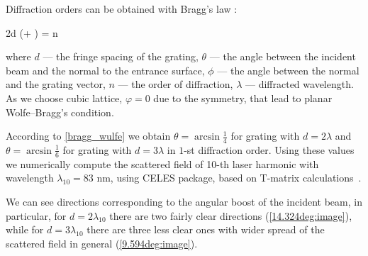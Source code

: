 \documentclass[conference]{IEEEtran}
\begin{document}
Diffraction orders can be obtained with Bragg's law \cite{kress_bernard}:

	\eq
		2d \sin(\theta + \varphi) = n\lambda
		\label{bragg_wulfe}
	\qe

\noindent where $d$ --- the fringe spacing of the grating, $\theta$ --- the angle between the incident beam and the normal to the entrance surface, $\phi$ --- the angle between the normal and the grating vector, $n$ --- the order of diffraction, $\lambda$ --- diffracted wavelength. As we choose cubic lattice, $\varphi = 0$ due to the symmetry, that lead to planar Wolfe–Bragg's condition.

According to \autoref{bragg_wulfe} we obtain $\theta = \arcsin\frac{1}{4}$ for grating with $d = 2\lambda$ and $\theta = \arcsin\frac{1}{6}$ for grating with $d = 3\lambda$ in $1$-st diffraction order. Using these values we numerically compute the scattered field of 10-th laser harmonic with wavelength $\lambda_{10} = 83$ nm, using CELES package, based on T-matrix calculations~\cite{t_matrix, celes}.

We can see directions corresponding to the angular boost of the incident beam, in particular, for $d = 2\lambda_{10}$ there are two fairly clear directions (\autoref{14.324deg:image}), while for $d = 3\lambda_{10}$ there are three less clear ones with wider spread of the scattered field in general (\autoref{9.594deg:image}).

\end{document}
